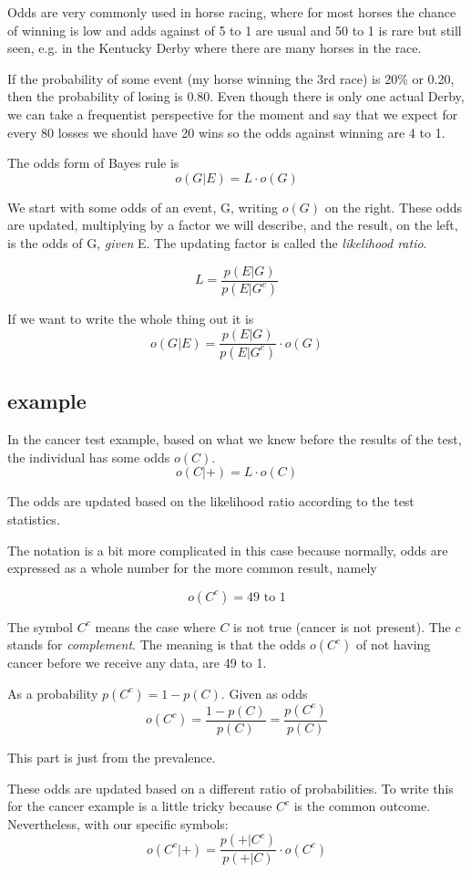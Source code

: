 \documentclass[11pt, oneside]{article}
\begin{document}
Odds are very commonly used in horse racing, where for most horses the chance of winning is low and adds against of 5 to 1 are usual and 50 to 1 is rare but still seen, e.g. in the Kentucky Derby where there are many horses in the race.

If the probability of some event (my horse winning the 3rd race)  is 20\% or 0.20, then the probability of losing is 0.80.  Even though there is only one actual Derby, we can take a frequentist perspective for the moment and say that we expect for every 80 losses we should have 20 wins so the odds against winning are 4 to 1.

The odds form of Bayes rule is
\[ o(G|E) = L \cdot o(G) \]

We start with some odds of an event, G, writing $o(G)$ on the right.  These odds are updated, multiplying by a factor we will describe, and the result, on the left, is the odds of G, \emph{given} E.  The updating factor is called the \emph{likelihood ratio}.

\[ L = \frac{p(E|G)}{p(E|G^{c})} \]

If we want to write the whole thing out it is
\[ o(G|E) =  \frac{p(E|G)}{p(E|G^{c})}  \cdot o(G) \]

\subsection*{example}

In the cancer test example, based on what we knew before the results of the test, the individual has some odds $o(C)$.  
\[ o(C|+) = L \cdot o(C) \]

The odds are updated based on the likelihood ratio according to the test statistics.

The notation is a bit more complicated in this case because normally, odds are expressed as a whole number for the more common result, namely

\[ o(C^c) = 49 \text{ to } 1 \]

The symbol $C^c$ means the case where $C$ is not true (cancer is not present).  The $c$ stands for \emph{complement}.  The meaning is that the odds $o(C^c)$ of not having cancer before we receive any data, are 49 to 1.  

As a probability $p(C^c) = 1 - p(C)$.  Given as odds
\[ o(C^c) = \frac{1 - p(C)}{p(C)} = \frac{p(C^c)}{p(C)} \]

This part is just from the prevalence.  

These odds are updated based on a different ratio of probabilities.  To write this for the cancer example is a little tricky because $C^c$ is the common outcome.  Nevertheless, with our specific symbols:
\[ o(C^c|+) = \frac{p(+|C^c)}{p(+|C)} \cdot o(C^c) \]
  
\end{document}
